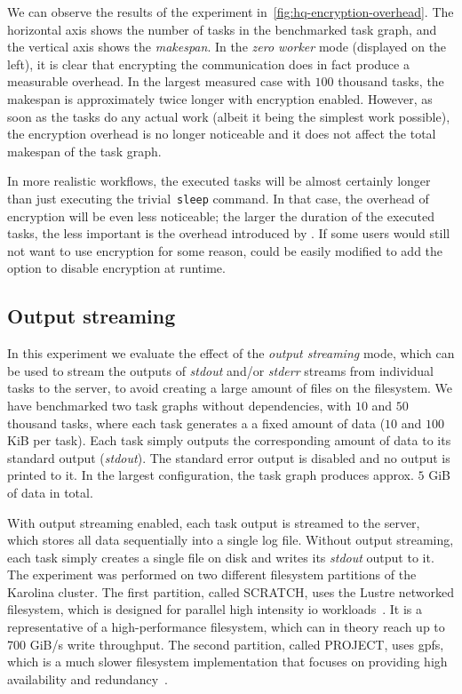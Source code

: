 We can observe the results of the experiment in~\autoref{fig:hq-encryption-overhead}. The horizontal axis shows
the number of tasks in the benchmarked task graph, and the vertical axis shows the
\emph{makespan}. In the \emph{zero worker} mode (displayed on the left), it is clear
that encrypting the communication does in fact produce a measurable overhead. In the largest
measured case with $100$ thousand tasks, the makespan is approximately twice
longer with encryption enabled. However, as soon as the tasks do any actual work (albeit it being
the simplest work possible), the encryption overhead is no longer noticeable and it does not affect
the total makespan of the task graph.

In more realistic workflows, the executed tasks will be almost certainly longer than just
executing the trivial~\texttt{sleep} command. In that case, the overhead of encryption will be even less
noticeable; the larger the duration of the executed tasks, the less important is the overhead
introduced by \hyperqueue{}. If some users would still not want to use encryption for
some reason, \hyperqueue{} could be easily modified to add the option to disable
encryption at runtime.

\subsection{Output streaming}
\label{sec:hq-exp-output-streaming}
In this experiment we evaluate the effect of the \emph{output streaming} mode, which can be used to
stream the outputs of \emph{stdout} and/or \emph{stderr} streams from
individual tasks to the \hyperqueue{} server, to avoid creating a large amount of files
on the filesystem. We have benchmarked two task graphs without dependencies, with
$10$ and $50$ thousand tasks, where each task generates a a
fixed amount of data ($10$ and $100$ KiB per task). Each task
simply outputs the corresponding amount of data to its standard output (\emph{stdout}).
The standard error output is disabled and no output is printed to it. In the largest configuration,
the task graph produces approx. $5$ GiB of data in total.

With output streaming enabled, each task output is streamed to the server, which stores all data
sequentially into a single log file. Without output streaming, each task simply creates a single
file on disk and writes its \emph{stdout} output to it. The experiment was performed on
two different filesystem partitions of the Karolina cluster. The first partition, called SCRATCH,
uses the Lustre networked filesystem, which is designed for parallel high intensity
\gls{io} workloads~\cite{karolina_scratch}. It is a representative of a
high-performance filesystem, which can in theory reach up to 700 GiB/s write throughput. The second
partition, called PROJECT, uses \gls{gpfs}, which is a much slower filesystem
implementation that focuses on providing high availability and redundancy~\cite{karolina_project}.

